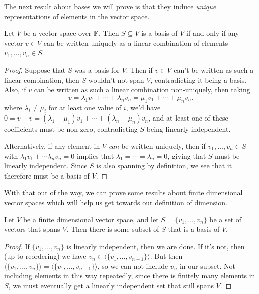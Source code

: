 \documentclass[a4paper]{scrartcl}
\begin{document}
The next result about bases we will prove is that they induce \emph{unique} representations of elements in the vector space.

\begin{lemma}
    Let $V$ be a vector space over $\mathbb{F}$. Then $S \subseteq V$ is a basis of $V$ if and only if any vector $v \in V$ can be written uniquely as a linear combination of elements $v_1, \dots, v_n \in S$.
\end{lemma}
\begin{proof}
    Suppose that $S$ was a basis for $V$.
    Then if $v \in V$ can't be written as such a linear combination, then $S$ wouldn't not span $V$, contradicting it being a basis.
    Also, if $v$ can be written as such a linear combination non-uniquely, then taking
    $$
v = \lambda_1 v_1 + \cdots + \lambda_n v_n = \mu_1 v_1 + \cdots + \mu_n v_n.
    $$
    where $\lambda_i \neq \mu_i$ for at least one value of $i$, we'd have
    $0 = v - v = (\lambda_1 - \mu_1) v_1 + \cdots + (\lambda_n - \mu_n)v_n$,
    and at least one of these coefficients must be non-zero, contradicting $S$ being linearly independent.

    Alternatively, if any element in $V$ \emph{can} be written uniquely, then if $v_1, \dots, v_n \in S$ with $\lambda_1 v_1 + \cdots \lambda_n v_n = 0$ implies that $\lambda_1 = \cdots = \lambda_n = 0$, giving that $S$ must be linearly independent. Since $S$ is also spanning by definition, we see that it therefore must be a basis of $V$.
\end{proof}

With that out of the way, we can prove some results about finite dimensional vector spaces which will help us get towards our definition of dimension. 

\begin{lemma}
    Let $V$ be a finite dimensional vector space, and let $S = \{v_1, \dots, v_n\}$ be a set of vectors that spans $V$. Then there is some subset of $S$ that is a basis of $V$.
\end{lemma}
\begin{proof}
    If $\{v_1, \dots, v_n\}$ is linearly independent, then we are done. If it's not, then (up to reordering) we have $v_n \in \langle\{v_1, \dots, v_{n - 1}\}\rangle$. But then $\langle\{v_1, \dots, v_n\}\rangle = \langle\{v_1, \dots, v_{n - 1}\}\rangle$, so we can not include $v_n$ in our subset. Not including elements in this way repeatedly, since there is finitely many elements in $S$, we must eventually get a linearly independent set that still spans $V$.
\end{proof}
\end{document}
